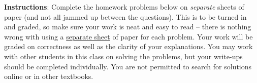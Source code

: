 \documentclass[10pt]{exam}
\newcommand{\onedot}{
  +(.5,.5) \v
}
\newcommand{\twodots}{
  +(.25,.25) \v +(.75,.75) \v
}
\newcommand{\threedots}{
+(.25,.25) \v +(.5, .5) \v +(.75,.75) \v
}
\newcommand{\fourdots}{
  +(.25,.25) \v +(.25,.75) \v +(.75,.25) \v +(.75,.75) \v
}
\newcommand{\fivedots}{
  +(.5,.5) \v +(.25,.25) \v +(.25,.75) \v +(.75,.25) \v +(.75,.75) \v
}
\newcommand{\sixdots}{
  +(.25,.5) \v +(.75,.5) \v +(.25,.25) \v +(.25,.75) \v +(.75,.25) \v +(.75,.75) \v
}
\newcommand{\dominoborder}{
  \draw[thick, rounded corners] (0,0) rectangle (1,2);
  \draw[thin] (0,1) -- (1,1);
}
\begin{document}
\noindent \textbf{Instructions}: Complete the homework problems below on {\em separate} sheets of paper (and not all jammed up between the questions).  This is to be turned in and graded, so make sure your work is neat and easy to read -- there is nothing wrong with using a \underline{separate sheet} of paper for each problem. Your work will be graded on correctness as well as the clarity of your explanations.  You may work with other students in this class on solving the problems, but your write-ups should be completed individually.  You are not permitted to search for solutions online or in other textbooks.

\end{document}
